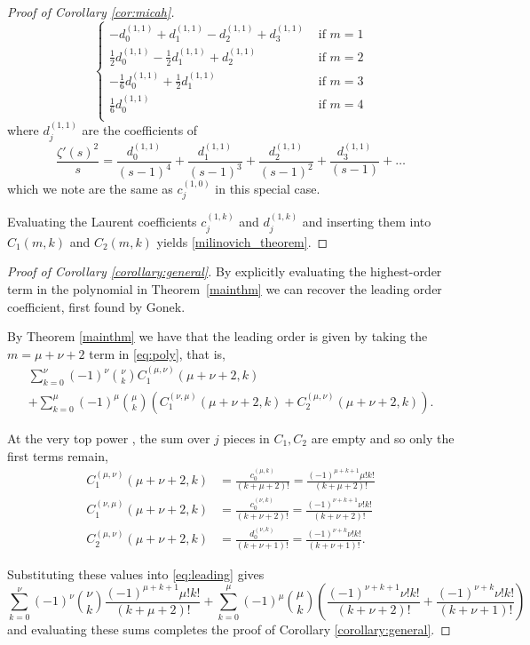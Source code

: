\documentclass[12pt, a4paper,reqno]{amsart}
\theoremstyle{definition}
\numberwithin{equation}{section}
\begin{document}
\begin{proof}[Proof of Corollary \ref{cor:micah}]
\[\begin{cases}
-d^{(1,1)}_0 +d^{(1,1)}_1 -d^{(1,1)}_2 +d^{(1,1)}_3  & \text{ if } m=1 \\[1.5ex]
\frac{1}{2} d^{(1,1)}_0 -\frac{1}{2} d^{(1,1)}_1 +d^{(1,1)}_2 & \text{ if } m=2 \\[1.5ex]
 -\frac{1}{6} d^{(1,1)}_0 +\frac{1}{2} d^{(1,1)}_1 & \text{ if } m=3 \\[1.5ex]
\frac{1}{6} d^{(1,1)}_0 & \text{ if } m=4 \\[1.5ex]
\end{cases}
\]
where $d^{(1,1)}_j$ are the coefficients of
\[
\frac{\zeta'(s)^2}{s} = \frac{d^{(1,1)}_0}{(s-1)^4} + \frac{d^{(1,1)}_1}{(s-1)^3} + \frac{d^{(1,1)}_2}{(s-1)^2} + \frac{d^{(1,1)}_3}{(s-1)} + \dots
\]
which we note are the same as $c^{(1,0)}_j$ in this special case.

Evaluating the Laurent coefficients $c^{(1,k)}_j$ and $d^{(1,k)}_j$ and inserting them into $C_1(m,k)$ and $C_2(m,k)$ yields \eqref{milinovich_theorem}.
\end{proof}

\begin{proof}[Proof of Corollary \ref{corollary:general}]

By explicitly evaluating the highest-order term in the polynomial in Theorem~\ref{mainthm} we can recover the leading order coefficient, first found by Gonek.

    By Theorem \ref{mainthm} we have that the leading order is given by taking the $m=\mu+\nu+2$ term in \eqref{eq:poly}, that is,
    \begin{multline}\label{eq:leading}
        \sum_{k=0}^{\nu}(-1)^{\nu}\binom{\nu}{k}C_1^{(\mu,\nu)}(\mu+\nu+2,k)\\+\sum_{k=0}^{\mu}(-1)^{\mu}\binom{\mu}{k}\left(C_1^{(\nu,\mu)}(\mu+\nu+2,k)+C_2^{(\mu,\nu)}(\mu+\nu+2,k)\right).
    \end{multline}

    At the very top power , the sum over $j$ pieces in $C_1, C_2$ are empty and so only the first terms remain,
    \begin{align*}
        C_1^{(\mu,\nu)}(\mu+\nu+2,k)&=\frac{c_0^{(\mu,k)}}{(k+\mu+2)!}=\frac{(-1)^{\mu+k+1}\mu!k!}{(k+\mu+2)!}\\ 
        C_1^{(\nu,\mu)}(\mu+\nu+2,k)&=\frac{c_0^{(\nu,k)}}{(k+\nu+2)!}=\frac{(-1)^{\nu+k+1}\nu!k!}{(k+\nu+2)!}\\
        C_2^{(\mu,\nu)}(\mu+\nu+2,k)&=\frac{d_0^{(\nu,k)}}{(k+\nu+1)!}=\frac{(-1)^{\nu+k}\nu!k!}{(k+\nu+1)!}.
    \end{align*}

Substituting these values into \eqref{eq:leading} gives
    \begin{equation*}
        \sum_{k=0}^{\nu}(-1)^{\nu}\binom{\nu}{k}\frac{(-1)^{\mu+k+1}\mu!k!}{(k+\mu+2)!}+\sum_{k=0}^{\mu}(-1)^{\mu}\binom{\mu}{k}\left(\frac{(-1)^{\nu+k+1}\nu!k!}{(k+\nu+2)!}+\frac{(-1)^{\nu+k}\nu!k!}{(k+\nu+1)!}\right)
    \end{equation*}
and evaluating these sums completes the proof of Corollary \ref{corollary:general}.
\end{proof}
\end{document}
